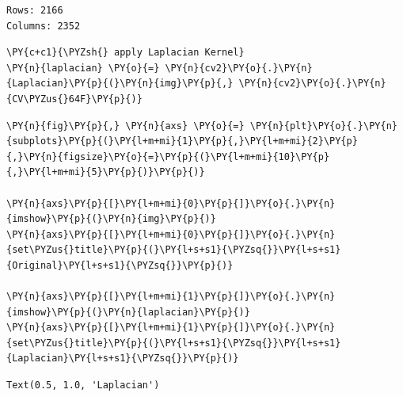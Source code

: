 \begin{Verbatim}[commandchars=\\\{\}]
Rows: 2166
Columns: 2352
\end{Verbatim}

\begin{tcolorbox}[breakable, size=fbox, boxrule=1pt, pad at break*=1mm,colback=cellbackground, colframe=cellborder]
	\begin{Verbatim}[commandchars=\\\{\}]
\PY{c+c1}{\PYZsh{} apply Laplacian Kernel}
\PY{n}{laplacian} \PY{o}{=} \PY{n}{cv2}\PY{o}{.}\PY{n}{Laplacian}\PY{p}{(}\PY{n}{img}\PY{p}{,} \PY{n}{cv2}\PY{o}{.}\PY{n}{CV\PYZus{}64F}\PY{p}{)}
	\end{Verbatim}
\end{tcolorbox}

\begin{tcolorbox}[breakable, size=fbox, boxrule=1pt, pad at break*=1mm,colback=cellbackground, colframe=cellborder]
	\begin{Verbatim}[commandchars=\\\{\}]
\PY{n}{fig}\PY{p}{,} \PY{n}{axs} \PY{o}{=} \PY{n}{plt}\PY{o}{.}\PY{n}{subplots}\PY{p}{(}\PY{l+m+mi}{1}\PY{p}{,}\PY{l+m+mi}{2}\PY{p}{,}\PY{n}{figsize}\PY{o}{=}\PY{p}{(}\PY{l+m+mi}{10}\PY{p}{,}\PY{l+m+mi}{5}\PY{p}{)}\PY{p}{)}

\PY{n}{axs}\PY{p}{[}\PY{l+m+mi}{0}\PY{p}{]}\PY{o}{.}\PY{n}{imshow}\PY{p}{(}\PY{n}{img}\PY{p}{)}
\PY{n}{axs}\PY{p}{[}\PY{l+m+mi}{0}\PY{p}{]}\PY{o}{.}\PY{n}{set\PYZus{}title}\PY{p}{(}\PY{l+s+s1}{\PYZsq{}}\PY{l+s+s1}{Original}\PY{l+s+s1}{\PYZsq{}}\PY{p}{)}

\PY{n}{axs}\PY{p}{[}\PY{l+m+mi}{1}\PY{p}{]}\PY{o}{.}\PY{n}{imshow}\PY{p}{(}\PY{n}{laplacian}\PY{p}{)}
\PY{n}{axs}\PY{p}{[}\PY{l+m+mi}{1}\PY{p}{]}\PY{o}{.}\PY{n}{set\PYZus{}title}\PY{p}{(}\PY{l+s+s1}{\PYZsq{}}\PY{l+s+s1}{Laplacian}\PY{l+s+s1}{\PYZsq{}}\PY{p}{)}
	\end{Verbatim}
\end{tcolorbox}


\begin{tcolorbox}[breakable, size=fbox, boxrule=.5pt, pad at break*=1mm, opacityfill=0]
\begin{Verbatim}[commandchars=\\\{\}]
Text(0.5, 1.0, 'Laplacian')
\end{Verbatim}
\end{tcolorbox}

